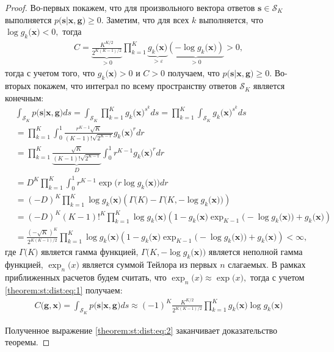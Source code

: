 \begin{proof}
	Во-первых покажем, что для произвольного вектора ответов $\mathbf{s} \in \mathcal{S}_K$ выполняется $p\bigr(\mathbf{s}|\mathbf{x}, \mathbf{g}\bigr) \geq 0$. Заметим, что для всех $k$ выполняется, что $\log g_k\bigr(\mathbf{x}\bigr) < 0,$ тогда
\[
\begin{aligned}
	C=\underbrace{\frac{K^{K/2}}{2^{K(K-1)/2}}}_{>0}\prod_{k=1}^{K}\underbrace{g_k\bigr(\mathbf{x}\bigr)}_{>\varepsilon}\underbrace{\left(-\log g_k\bigr(\mathbf{x}\bigr)\right)}_{>0} > 0,
\end{aligned}
\]
тогда с учетом того, что $g_k\bigr(\mathbf{x}\bigr) >0$ и $C>0$ получаем, что $p\bigr(\mathbf{s}|\mathbf{x}, \mathbf{g}\bigr) \geq 0$.
	Во-вторых покажем, что интеграл по всему пространству ответов $\mathcal{S}_K$ является конечным:
	\[
	\label{theorem:st:dist:eq:1}
	\begin{aligned}
		& \int_{\mathcal{S}_K}p\bigr(\mathbf{s}|\mathbf{x}, \mathbf{g}\bigr)ds = \int_{\mathcal{S}_K}\prod_{k=1}^{K}g_k\bigr(\mathbf{x}\bigr)^{s^k}ds = \prod_{k=1}^{K}\int_{\mathcal{S}_K}g_k\bigr(\mathbf{x}\bigr)^{s^k}ds\\ 
		& = \prod_{k=1}^{K}\int_{0}^{1}\frac{r^{K-1}\sqrt{K}}{\left(K-1\right)!\sqrt{2^{K-1}}}g_k\bigr(\mathbf{x}\bigr)^{r}dr \\ 
		& = \prod_{k=1}^{K}\underbrace{\frac{\sqrt{K}}{\left(K-1\right)!\sqrt{2^{K-1}}}}_{D}\int_{0}^{1}r^{K-1}g_k\bigr(\mathbf{x}\bigr)^{r}dr \\
		& = D^K\prod_{k=1}^{K} \int_{0}^{1}r^{K-1}\exp\bigr(r\log g_k\bigr(\mathbf{x}\bigr)\bigr)dr \\
		& = \left(-D\right)^K\prod_{k=1}^{K}\log g_k\bigr(\mathbf{x}\bigr)\left(\Gamma\bigr(K\bigr) - \Gamma\bigr(K, -\log g_k\bigr(\mathbf{x}\bigr)\bigr)\right) \\
		& = \left(-D\right)^K\left(K-1\right)!^K\prod_{k=1}^{K}\log g_k\bigr(\mathbf{x}\bigr)\left(1 -g_k\bigr(\mathbf{x}\bigr) \exp_{K-1}\bigr(-\log g_k\bigr(\mathbf{x}\bigr)\bigr)+g_k\bigr(\mathbf{x}\bigr)\right) \\
		& = \frac{\left(-\sqrt{K}\right)^K}{2^{K(K-1)/2}}\prod_{k=1}^{K}\log g_k\bigr(\mathbf{x}\bigr)\left(1 -g_k\bigr(\mathbf{x}\bigr) \exp_{K-1}\bigr(-\log g_k\bigr(\mathbf{x}\bigr)\bigr)+g_k\bigr(\mathbf{x}\bigr)\right) < \infty,
	\end{aligned}
	\]
где $\Gamma\bigr(K\bigr)$ является гамма функцией, $\Gamma\bigr(K, -\log g_k\bigr(\mathbf{x}\bigr)\bigr)$ является неполной гамма функцией, $\exp_{n}\bigr(x\bigr)$ является суммой Тейлора из первых $n$ слагаемых. В рамках приближенных расчетов будем считать, что $\exp_{n}\bigr(x\bigr)\approx\exp\bigr(x\bigr),$ тогда с учетом \eqref{theorem:st:dist:eq:1} получаем:
	\[
	\label{theorem:st:dist:eq:2}
	\begin{aligned}
		C\bigr(\mathbf{g}, \mathbf{x}\bigr) = \int_{\mathcal{S}_K}p\bigr(\mathbf{s}|\mathbf{x}, \mathbf{g}\bigr)ds \approx \left(-1\right)^{K}\frac{K^{K/2}}{2^{K(K-1)/2}}\prod_{k=1}^{K}g_k\bigr(\mathbf{x}\bigr)\log g_k\bigr(\mathbf{x}\bigr)
	\end{aligned}
	\]
	
Полученное выражение \eqref{theorem:st:dist:eq:2} заканчивает доказательство теоремы.
\end{proof}

